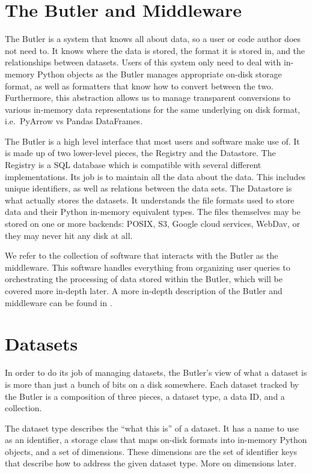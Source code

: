 \documentclass[11pt,twoside]{article}
\begin{document}
\section{The Butler and Middleware}
The Butler is a system that knows all about data, so a user or code author does not need to. It knows where the data is stored, the format it is stored in, and the relationships between datasets. Users of this system only need to deal with in-memory Python objects as the Butler manages appropriate on-disk storage format, as well as formatters that know how to convert between the two. Furthermore, this abstraction allows us to manage transparent conversions to various in-memory data representations for the same underlying on disk format, i.e.\ PyArrow vs Pandas DataFrames.

The Butler is a high level interface that most users and software make use of. It is made up of two lower-level pieces, the Registry and the Datastore. The Registry is a SQL database which is compatible with several different implementations. Its job is to maintain all the data about the data. This includes unique identifiers, as well as relations between the data sets. The Datastore is what actually stores the datasets. It understands the file formats used to store data and their Python in-memory equivalent types. The files themselves may be stored on one or more backends: POSIX, S3, Google cloud services, WebDav, or they may never hit any disk at all.

We refer to the collection of software that interacts with the Butler as the middleware. This software handles everything from organizing user queries to orchestrating the processing of data stored within the Butler, which will be covered more in-depth later.
A more in-depth description of the Butler and middleware can be found in \citet{2022SPIE12189E..11J}.

\section{Datasets}
In order to do its job of managing datasets, the Butler's view of what a dataset is is more than just a bunch of bits on a disk somewhere. Each dataset tracked by the Butler is a composition of three pieces, a dataset type, a data ID, and a collection.

The dataset type describes the ``what this is'' of a dataset. It has a name to use as an identifier, a storage class that maps on-disk formats into in-memory Python objects, and a set of dimensions. These dimensions are the set of identifier keys that describe how to address the given dataset type. More on dimensions later.
\end{document}
